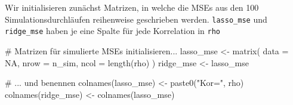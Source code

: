 \documentclass[
  a4paper,
  DIV=11,
  oneside]{scrreprt}
\newenvironment{Shaded}{\begin{snugshade}}{\end{snugshade}}
\newcommand{\AttributeTok}[1]{\textcolor[rgb]{0.40,0.45,0.13}{#1}}
\newcommand{\CommentTok}[1]{\textcolor[rgb]{0.37,0.37,0.37}{#1}}
\newcommand{\ConstantTok}[1]{\textcolor[rgb]{0.56,0.35,0.01}{#1}}
\newcommand{\ControlFlowTok}[1]{\textcolor[rgb]{0.00,0.23,0.31}{#1}}
\newcommand{\DecValTok}[1]{\textcolor[rgb]{0.68,0.00,0.00}{#1}}
\newcommand{\FunctionTok}[1]{\textcolor[rgb]{0.28,0.35,0.67}{#1}}
\newcommand{\NormalTok}[1]{\textcolor[rgb]{0.00,0.23,0.31}{#1}}
\newcommand{\OtherTok}[1]{\textcolor[rgb]{0.00,0.23,0.31}{#1}}
\newcommand{\SpecialCharTok}[1]{\textcolor[rgb]{0.37,0.37,0.37}{#1}}
\newcommand{\StringTok}[1]{\textcolor[rgb]{0.13,0.47,0.30}{#1}}
\begin{document}
\begin{Shaded}
\end{Shaded}

Wir initialisieren zunächst Matrizen, in welche die MSEs aus den 100
Simulationsdurchläufen reihenweise geschrieben werden.
\texttt{lasso\_mse} und \texttt{ridge\_mse} haben je eine Spalte für
jede Korrelation in \texttt{rho}

\begin{Shaded}
\begin{Highlighting}[]
\CommentTok{\# Matrizen für simulierte MSEs initialisieren...}
\NormalTok{lasso\_mse }\OtherTok{\textless{}{-}} \FunctionTok{matrix}\NormalTok{(}
  \AttributeTok{data =} \ConstantTok{NA}\NormalTok{, }
  \AttributeTok{nrow =}\NormalTok{ n\_sim, }
  \AttributeTok{ncol =} \FunctionTok{length}\NormalTok{(rho)}
\NormalTok{) }
\NormalTok{ridge\_mse }\OtherTok{\textless{}{-}}\NormalTok{ lasso\_mse}

\CommentTok{\# ... und benennen}
\FunctionTok{colnames}\NormalTok{(lasso\_mse) }\OtherTok{\textless{}{-}} \FunctionTok{paste0}\NormalTok{(}\StringTok{"Kor="}\NormalTok{, rho)}
\FunctionTok{colnames}\NormalTok{(ridge\_mse) }\OtherTok{\textless{}{-}} \FunctionTok{colnames}\NormalTok{(lasso\_mse)}
\end{Highlighting}
\end{Shaded}
\end{document}
